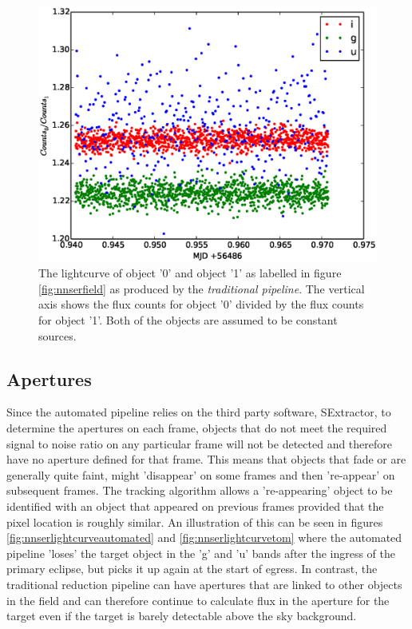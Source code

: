 \begin{figure}[!h]
\centering
\includegraphics[width=140mm]{images/differential_trad.eps}
\caption{The lightcurve of object '0' and object '1' as labelled in figure \ref{fig:nnserfield} as produced by the \emph{traditional pipeline}. The vertical axis shows the flux counts for object '0' divided by the flux counts for object '1'. Both of the objects are assumed to be constant sources. }
\label{fig:differentialtrad}
\end{figure}


\subsection{Apertures}
Since the automated pipeline relies on the third party software, SExtractor, to determine the apertures on each frame, objects that do not meet the required signal to noise ratio on any particular frame will not be detected and therefore have no aperture defined for that frame. This means that objects that fade or are generally quite faint, might 'disappear' on some frames and then 're-appear' on subsequent frames. The tracking algorithm allows a 're-appearing' object to be identified with an object that appeared on previous frames provided that the pixel location is roughly similar. An illustration of this can be seen in figures \ref{fig:nnserlightcurveautomated} and \ref{fig:nnserlightcurvetom} where the automated pipeline 'loses' the target object in the 'g' and 'u' bands after the ingress of the primary eclipse, but picks it up again at the start of egress. In contrast, the traditional reduction pipeline can have apertures that are linked to other objects in the field and can therefore continue to calculate flux in the aperture for the target even if the target is barely detectable above the sky background.
